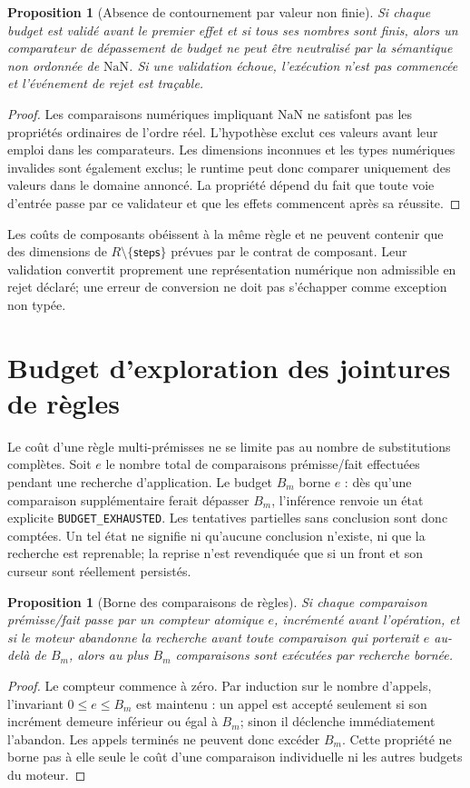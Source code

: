 \documentclass[11pt,a4paper,openany]{book}
\theoremstyle{definition}
\theoremstyle{plain}
\newtheorem{proposition}[definition]{Proposition}
\theoremstyle{remark}
\begin{document}
\begin{proposition}[Absence de contournement par valeur non finie]
Si chaque budget est validé avant le premier effet et si tous ses nombres sont finis, alors un comparateur de dépassement de budget ne peut être neutralisé par la sémantique non ordonnée de $\mathrm{NaN}$. Si une validation échoue, l'exécution n'est pas commencée et l'événement de rejet est traçable.
\end{proposition}
\begin{proof}
Les comparaisons numériques impliquant $\mathrm{NaN}$ ne satisfont pas les propriétés ordinaires de l'ordre réel. L'hypothèse exclut ces valeurs avant leur emploi dans les comparateurs. Les dimensions inconnues et les types numériques invalides sont également exclus; le runtime peut donc comparer uniquement des valeurs dans le domaine annoncé. La propriété dépend du fait que toute voie d'entrée passe par ce validateur et que les effets commencent après sa réussite.
\end{proof}

Les coûts de composants obéissent à la même règle et ne peuvent contenir que des dimensions de $R\setminus\{\mathsf{steps}\}$ prévues par le contrat de composant. Leur validation convertit proprement une représentation numérique non admissible en rejet déclaré; une erreur de conversion ne doit pas s'échapper comme exception non typée.

\section{Budget d'exploration des jointures de règles}
Le coût d'une règle multi-prémisses ne se limite pas au nombre de substitutions complètes. Soit $e$ le nombre total de comparaisons prémisse/fait effectuées pendant une recherche d'application. Le budget $B_m$ borne $e$ : dès qu'une comparaison supplémentaire ferait dépasser $B_m$, l'inférence renvoie un état explicite \texttt{BUDGET\_EXHAUSTED}. Les tentatives partielles sans conclusion sont donc comptées. Un tel état ne signifie ni qu'aucune conclusion n'existe, ni que la recherche est reprenable; la reprise n'est revendiquée que si un front et son curseur sont réellement persistés.

\begin{proposition}[Borne des comparaisons de règles]
Si chaque comparaison prémisse/fait passe par un compteur atomique $e$, incrémenté avant l'opération, et si le moteur abandonne la recherche avant toute comparaison qui porterait $e$ au-delà de $B_m$, alors au plus $B_m$ comparaisons sont exécutées par recherche bornée.
\end{proposition}
\begin{proof}
Le compteur commence à zéro. Par induction sur le nombre d'appels, l'invariant $0\le e\le B_m$ est maintenu : un appel est accepté seulement si son incrément demeure inférieur ou égal à $B_m$; sinon il déclenche immédiatement l'abandon. Les appels terminés ne peuvent donc excéder $B_m$. Cette propriété ne borne pas à elle seule le coût d'une comparaison individuelle ni les autres budgets du moteur.
\end{proof}
\end{document}
